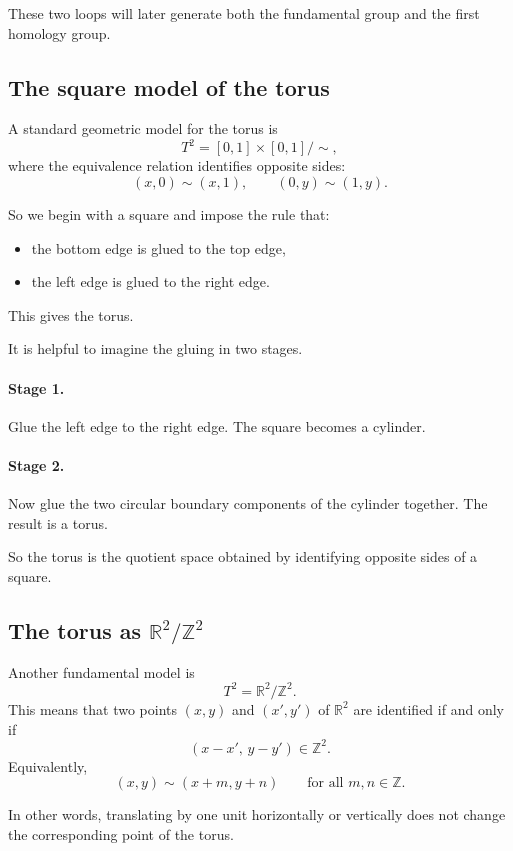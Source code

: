\documentclass[12pt,a4paper]{article}
\theoremstyle{notespace}
\begin{document}
These two loops will later generate both the fundamental group and the first homology group.

\subsection{The square model of the torus}

A standard geometric model for the torus is
\[
T^2=[0,1]\times[0,1]/\sim,
\]
where the equivalence relation identifies opposite sides:
\[
(x,0)\sim (x,1),
\qquad
(0,y)\sim (1,y).
\]

So we begin with a square and impose the rule that:

\begin{itemize}
	\item the bottom edge is glued to the top edge,
	\item the left edge is glued to the right edge.
\end{itemize}

This gives the torus.

It is helpful to imagine the gluing in two stages.

\paragraph{Stage 1.}
Glue the left edge to the right edge. The square becomes a cylinder.

\paragraph{Stage 2.}
Now glue the two circular boundary components of the cylinder together. The result is a torus.

So the torus is the quotient space obtained by identifying opposite sides of a square.

\subsection{The torus as \(\mathbb R^2/\mathbb Z^2\)}

Another fundamental model is
\[
T^2=\mathbb R^2/\mathbb Z^2.
\]
This means that two points \((x,y)\) and \((x',y')\) of \(\mathbb R^2\) are identified if and only if
\[
(x-x',\,y-y')\in \mathbb Z^2.
\]
Equivalently,
\[
(x,y)\sim (x+m,y+n)
\qquad\text{for all }m,n\in\mathbb Z.
\]

In other words, translating by one unit horizontally or vertically does not change the corresponding point of the torus.
\end{document}
